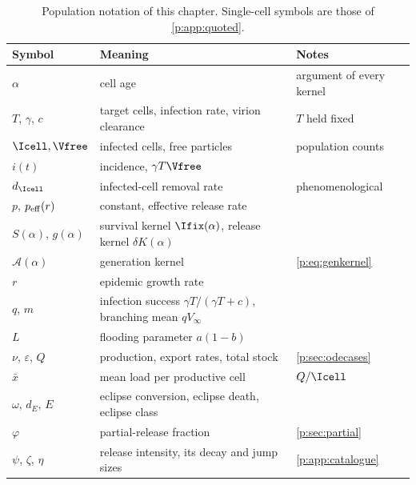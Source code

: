 \begin{table}[htbp]
\centering
\renewcommand{\arraystretch}{1.12}
\small
\begin{tabular}{@{}lp{}p{}@{}}
\toprule
Symbol & Meaning & Notes \\
\midrule
$\alpha$ & cell age & argument of every kernel \\
$T$, $\gamma$, $c$ & target cells, infection rate, virion clearance & $T$ held fixed \\
$\Icell,\Vfree$ & infected cells, free particles & population counts \\
$i(t)$ & incidence, $\gamma T\Vfree$ & \\
$d_{\Icell}$ & infected-cell removal rate & phenomenological \\
$p$, $p_{\rm eff}(r)$ & constant, effective release rate & \\
$S(\alpha)$, $g(\alpha)$ & survival kernel $\Ifix(\alpha)$, release kernel $\delta K(\alpha)$ & \\
$\mathcal A(\alpha)$ & generation kernel & \cref{p:eq:genkernel} \\
$r$ & epidemic growth rate & \\
$q$, $m$ & infection success $\gamma T/(\gamma T+c)$, branching mean $qV_\infty$ & \\
$L$ & flooding parameter $a(1-b)$ & \\
$\nu$, $\varepsilon$, $Q$ & production, export rates, total stock & \cref{p:sec:odecases} \\
$\bar x$ & mean load per productive cell & $Q/\Icell$ \\
$\omega$, $d_E$, $E$ & eclipse conversion, eclipse death, eclipse class & \\
$\varphi$ & partial-release fraction & \cref{p:sec:partial} \\
$\psi$, $\zeta$, $\eta$ & release intensity, its decay and jump sizes & \cref{p:app:catalogue} \\
\bottomrule
\end{tabular}
\caption{Population notation of this chapter. Single-cell symbols are those
of \cref{p:app:quoted}.}
\label{p:tab:notation}
\end{table}

\FloatBarrier
